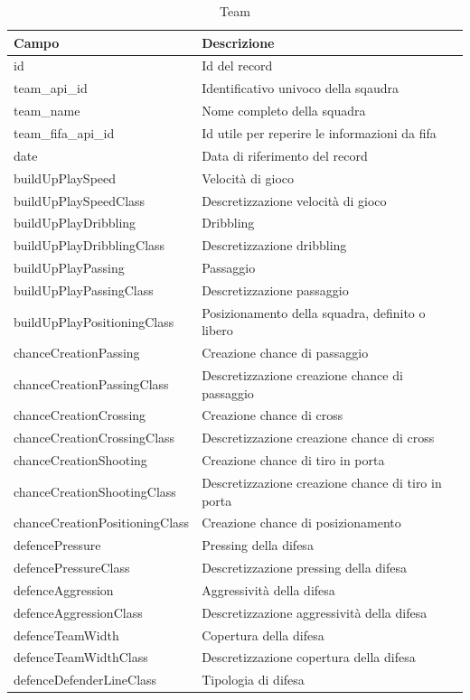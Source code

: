 \documentclass[hidelinks, 12pt]{article}
\begin{document}
	\begin{table}[H]
		\caption{Team}\label{tab:team_attr}
		\begin{tabular}{|l|l|l|}
			\hline
			Campo & Descrizione \\
			\hline
			id & Id del record \\
			team\_api\_id & Identificativo univoco della sqaudra \\
			team\_name & Nome completo della squadra \\
			team\_fifa\_api\_id & Id utile per reperire le informazioni da fifa \\
			date & Data di riferimento del record \\
			buildUpPlaySpeed & Velocità di gioco \\
			buildUpPlaySpeedClass & Descretizzazione velocità di gioco \\
			buildUpPlayDribbling & Dribbling \\
			buildUpPlayDribblingClass & Descretizzazione dribbling \\
			buildUpPlayPassing & Passaggio \\
			buildUpPlayPassingClass & Descretizzazione passaggio \\
			buildUpPlayPositioningClass & Posizionamento della squadra, definito o libero \\
			chanceCreationPassing & Creazione chance di passaggio \\
			chanceCreationPassingClass & Descretizzazione creazione chance di passaggio \\
			chanceCreationCrossing & Creazione chance di cross \\
			chanceCreationCrossingClass & Descretizzazione creazione chance di cross \\
			chanceCreationShooting & Creazione chance di tiro in porta \\
			chanceCreationShootingClass & Descretizzazione creazione chance di tiro in porta \\
			chanceCreationPositioningClass & Creazione chance di posizionamento \\
			defencePressure & Pressing della difesa \\
			defencePressureClass & Descretizzazione pressing della difesa \\
			defenceAggression & Aggressività della difesa  \\
			defenceAggressionClass & Descretizzazione aggressività della difesa \\
			defenceTeamWidth & Copertura della difesa \\
			defenceTeamWidthClass & Descretizzazione copertura della difesa \\
			defenceDefenderLineClass & Tipologia di difesa \\
			\hline
		\end{tabular}
	\end{table}
\end{document}
